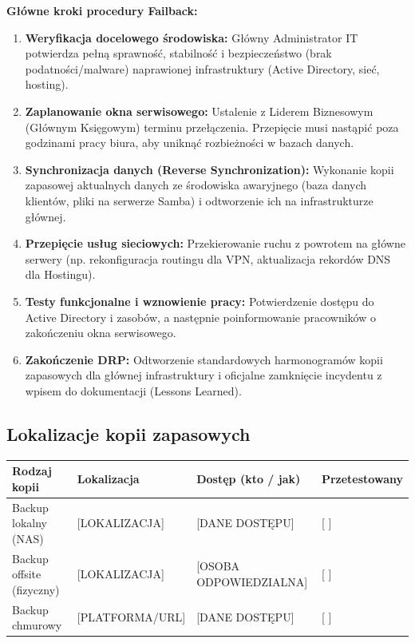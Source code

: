\documentclass[12pt,a4paper]{article}
\providecommand{\tightlist}{\setlength{\itemsep}{0pt}\setlength{\parskip}{0pt}}
\begin{document}
\textbf{Główne kroki procedury Failback:}
\begin{enumerate}
\tightlist
\item
  \textbf{Weryfikacja docelowego środowiska:} Główny Administrator IT potwierdza pełną sprawność, stabilność i bezpieczeństwo (brak podatności/malware) naprawionej infrastruktury (Active Directory, sieć, hosting).
\item
  \textbf{Zaplanowanie okna serwisowego:} Ustalenie z Liderem Biznesowym (Głównym Księgowym) terminu przełączenia. Przepięcie musi nastąpić poza godzinami pracy biura, aby uniknąć rozbieżności w bazach danych.
\item
  \textbf{Synchronizacja danych (Reverse Synchronization):} Wykonanie kopii zapasowej aktualnych danych ze środowiska awaryjnego (baza danych klientów, pliki na serwerze Samba) i odtworzenie ich na infrastrukturze głównej.
\item
  \textbf{Przepięcie usług sieciowych:} Przekierowanie ruchu z powrotem na główne serwery (np. rekonfiguracja routingu dla VPN, aktualizacja rekordów DNS dla Hostingu).
\item
  \textbf{Testy funkcjonalne i wznowienie pracy:} Potwierdzenie dostępu do Active Directory i zasobów, a następnie poinformowanie pracowników o zakończeniu okna serwisowego.
\item
  \textbf{Zakończenie DRP:} Odtworzenie standardowych harmonogramów kopii zapasowych dla głównej infrastruktury i oficjalne zamknięcie incydentu z wpisem do dokumentacji (Lessons Learned).
\end{enumerate}



\subsection{Lokalizacje kopii zapasowych}\label{lokalizacje-kopii-zapasowych}

\begin{longtable}[]{@{}>{\raggedright\arraybackslash}p{}>{\raggedright\arraybackslash}p{}>{\raggedright\arraybackslash}p{}>{\raggedright\arraybackslash}p{}@{}}
\toprule\noalign{}
Rodzaj kopii & Lokalizacja & Dostęp (kto / jak) & Przetestowany \\
\midrule\noalign{}
\endhead
\bottomrule\noalign{}
\endlastfoot
Backup lokalny (NAS) & {[}LOKALIZACJA{]} & {[}DANE DOSTĘPU{]} & {[} {]}
\underline{\hspace{2cm}} \\
Backup offsite (fizyczny) & {[}LOKALIZACJA{]} & {[}OSOBA
ODPOWIEDZIALNA{]} & {[} {]} \underline{\hspace{2cm}} \\
Backup chmurowy & {[}PLATFORMA/URL{]} & {[}DANE DOSTĘPU{]} & {[} {]}
\underline{\hspace{2cm}} \\
\end{longtable}
\end{document}
